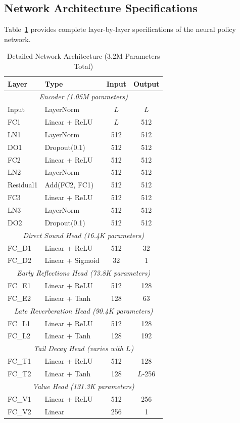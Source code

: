 \documentclass[12pt,a4paper]{article}
\begin{document}
\subsection{Network Architecture Specifications}

Table~\ref{tab:architecture_detailed} provides complete layer-by-layer specifications of the neural policy network.

\begin{table}[h]
\centering
\caption{Detailed Network Architecture (3.2M Parameters Total)}
\label{tab:architecture_detailed}
\small
\begin{tabular}{@{}llcc@{}}
\toprule
\textbf{Layer} & \textbf{Type} & \textbf{Input} & \textbf{Output} \\
\midrule
\multicolumn{4}{c}{\textit{Encoder (1.05M parameters)}} \\
\midrule
Input & LayerNorm & $L$ & $L$ \\
FC1 & Linear + ReLU & $L$ & 512 \\
LN1 & LayerNorm & 512 & 512 \\
DO1 & Dropout(0.1) & 512 & 512 \\
FC2 & Linear + ReLU & 512 & 512 \\
LN2 & LayerNorm & 512 & 512 \\
Residual1 & Add(FC2, FC1) & 512 & 512 \\
FC3 & Linear + ReLU & 512 & 512 \\
LN3 & LayerNorm & 512 & 512 \\
DO2 & Dropout(0.1) & 512 & 512 \\
\midrule
\multicolumn{4}{c}{\textit{Direct Sound Head (16.4K parameters)}} \\
\midrule
FC\_D1 & Linear + ReLU & 512 & 32 \\
FC\_D2 & Linear + Sigmoid & 32 & 1 \\
\midrule
\multicolumn{4}{c}{\textit{Early Reflections Head (73.8K parameters)}} \\
\midrule
FC\_E1 & Linear + ReLU & 512 & 128 \\
FC\_E2 & Linear + Tanh & 128 & 63 \\
\midrule
\multicolumn{4}{c}{\textit{Late Reverberation Head (90.4K parameters)}} \\
\midrule
FC\_L1 & Linear + ReLU & 512 & 128 \\
FC\_L2 & Linear + Tanh & 128 & 192 \\
\midrule
\multicolumn{4}{c}{\textit{Tail Decay Head (varies with $L$)}} \\
\midrule
FC\_T1 & Linear + ReLU & 512 & 128 \\
FC\_T2 & Linear + Tanh & 128 & $L$-256 \\
\midrule
\multicolumn{4}{c}{\textit{Value Head (131.3K parameters)}} \\
\midrule
FC\_V1 & Linear + ReLU & 512 & 256 \\
FC\_V2 & Linear & 256 & 1 \\
\bottomrule
\end{tabular}
\end{table}
\end{document}
